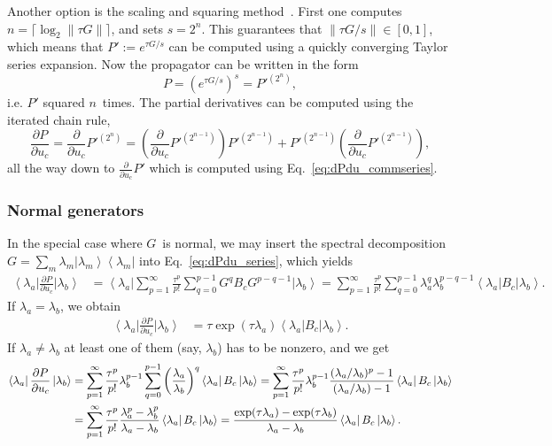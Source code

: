 \documentclass[aps, pra, a4paper, longbibliography, superscriptaddress]{revtex4-1}
\newcommand{\be}{\begin{equation}}
\newcommand{\ee}{\end{equation}}
\newcommand{\ket}[1]{\left| #1 \right \rangle}
\newcommand{\bra}[1]{\left \langle #1 \right|}
\newcommand{\dd}[2]{\frac{\partial #1}{\partial #2}}
\begin{document}
Another option is the scaling and squaring method~\cite{Higham2009}.
First one computes
$n = \lceil \log_2 \|\tau G\|\rceil$,
and sets $s = 2^n$.
This guarantees that
$\|\tau G/s\| \in [0,1]$,
which means that
$P' := e^{\tau G/s}$
can be computed using a quickly converging Taylor series expansion.
Now the propagator can be written in the form
\be
P = \left(e^{\tau G/s}\right)^{s} = P'^{(2^n)},
\ee
i.e. $P'$ squared $n$~times.
The partial derivatives can be computed using the iterated chain rule,
\be
\dd{P}{u_{c}}
= \dd{}{u_{c}} P'^{(2^{n})}
= \left(\dd{}{u_{c}} P'^{(2^{n-1})}\right) P'^{(2^{n-1})} +P'^{(2^{n-1})} \left(\dd{}{u_{c}} P'^{(2^{n-1})}\right),
\ee
all the way down to
$\dd{}{u_{c}} P'$
which is computed using Eq.~\eqref{eq:dPdu_commseries}.


\subsubsection{Normal generators}
\label{sec:dPdu_normal}

In the special case where $G$~is normal, we may insert the spectral decomposition
$G = \sum_m \lambda_m \ket{\lambda_m} \bra{\lambda_m}$
into Eq.~\eqref{eq:dPdu_series}, which yields
\begin{align}
\bra{\lambda_a} \dd{P}{u_{c}} \ket{\lambda_b}
&=
\bra{\lambda_a} \sum_{p=1}^{\infty} \frac{\tau^p}{p!} \sum_{q=0}^{p-1}
G^{q} B_c G^{p-q-1} \ket{\lambda_b}
=
\sum_{p=1}^{\infty} \frac{\tau^p}{p!} \sum_{q=0}^{p-1}
\lambda_a^{q} \lambda_b^{p-q-1} \bra{\lambda_a} B_c \ket{\lambda_b}.
\end{align}
If $\lambda_a = \lambda_b$, we obtain
\begin{align}
\bra{\lambda_a} \dd{P}{u_{c}} \ket{\lambda_b}
&=
\tau \exp(\tau \lambda_a) \bra{\lambda_a} B_c \ket{\lambda_b}.
\end{align}
If $\lambda_a \neq \lambda_b$ at least one of them (say, $\lambda_b$) has to be nonzero,
and we get
\begin{align}
\notag
\bra{\lambda_a} \dd{P}{u_{c}} \ket{\lambda_b}
&=
\sum_{p=1}^{\infty} \frac{\tau^p}{p!} \lambda_b^{p-1}
\sum_{q=0}^{p-1} \left(\frac{\lambda_a}{\lambda_b}\right)^{q}  \bra{\lambda_a} B_c \ket{\lambda_b}
=
\sum_{p=1}^{\infty} \frac{\tau^p}{p!} \lambda_b^{p-1}
\frac{(\lambda_a/\lambda_b)^p -1}{(\lambda_a/\lambda_b) -1}  \bra{\lambda_a} B_c \ket{\lambda_b}\\
&=
\sum_{p=1}^{\infty} \frac{\tau^p}{p!}
\frac{\lambda_a^p -\lambda_b^p}{\lambda_a -\lambda_b}  \bra{\lambda_a} B_c \ket{\lambda_b}
=
\frac{\exp(\tau \lambda_a) -\exp(\tau \lambda_b)}{\lambda_a -\lambda_b}  \bra{\lambda_a} B_c \ket{\lambda_b}.
\end{align}
\end{document}
